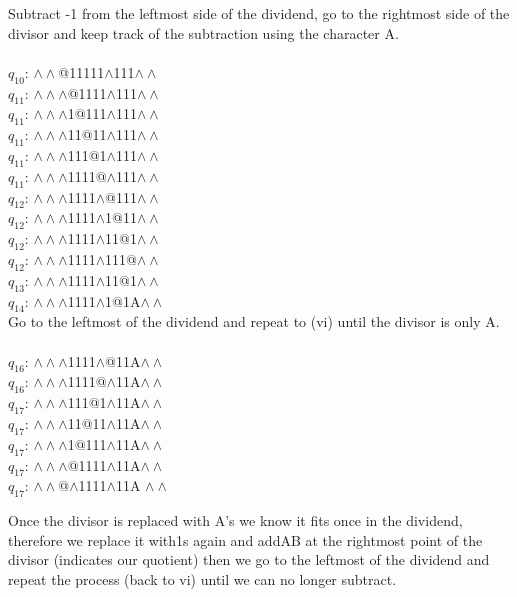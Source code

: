 \documentclass[a4paper]{article} %
\begin{document}
\begin{tasks}[label={(\roman*)},label-width={0.7cm},before-skip = -\parskip , %
            after-skip = -\parskip,
            after-item-skip = -\parskip]
            \task
            Subtract -1 from the leftmost side of the dividend, go to the rightmost side of the divisor and keep track of the subtraction using the character A.\\\\
            $q_{10}$: $\land\land$@11111$\land$111$\land\land$\\
            $q_{11}$: $\land\land\land$@1111$\land$111$\land\land$\\
            $q_{11}$: $\land\land\land$1@111$\land$111$\land\land$\\
            $q_{11}$: $\land\land\land$11@11$\land$111$\land\land$\\
            $q_{11}$: $\land\land\land$111@1$\land$111$\land\land$\\
            $q_{11}$: $\land\land\land$1111@$\land$111$\land\land$\\
            $q_{12}$: $\land\land\land$1111$\land$@111$\land\land$\\
            $q_{12}$: $\land\land\land$1111$\land$1@11$\land\land$\\
            $q_{12}$: $\land\land\land$1111$\land$11@1$\land\land$\\
            $q_{12}$: $\land\land\land$1111$\land$111@$\land\land$\\
            $q_{13}$: $\land\land\land$1111$\land$11@1$\land\land$\\
            $q_{14}$: $\land\land\land$1111$\land$1@1A$\land\land$\\
            \task
            Go to the leftmost of the dividend and repeat to (vi) until the divisor is only A.\\\\
            $q_{16}$: $\land\land\land$1111$\land$@11A$\land\land$\\
            $q_{16}$: $\land\land\land$1111@$\land$11A$\land\land$\\
            $q_{17}$: $\land\land\land$111@1$\land$11A$\land\land$\\
            $q_{17}$: $\land\land\land$11@11$\land$11A$\land\land$\\
            $q_{17}$: $\land\land\land$1@111$\land$11A$\land\land$\\
            $q_{17}$: $\land\land\land$@1111$\land$11A$\land\land$\\
            $q_{17}$: $\land\land$@$\land$1111$\land$11A $\land\land$

            \task
            Once the divisor is replaced with A's we know it fits once in the dividend, therefore we replace it with1s again and addAB at the rightmost point of the divisor (indicates our quotient)
            then we go to the leftmost of the dividend and repeat the process (back to vi) until we can no longer subtract.\\\\


\end{tasks}
\end{document}
